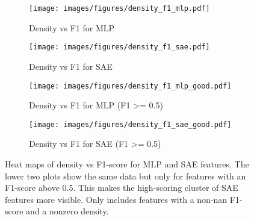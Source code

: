 \begin{figure}[h]
    \centering
    
    \begin{subfigure}[b]{0.45\textwidth}
        \centering
        \texttt{[image: images/figures/density\_f1\_mlp.pdf]}
        \caption{Density vs F1 for MLP}
        \label{fig:density_f1_mlp}
    \end{subfigure}
    \begin{subfigure}[b]{0.45\textwidth}
        \centering
        \texttt{[image: images/figures/density\_f1\_sae.pdf]}
        \caption{Density vs F1 for SAE}
        \label{fig:density_f1_sae}
    \end{subfigure}
    
    
    \begin{subfigure}[b]{0.45\textwidth}
        \centering
        \texttt{[image: images/figures/density\_f1\_mlp\_good.pdf]}
        \caption{Density vs F1 for MLP (F1 >= 0.5)}
        \label{fig:density_f1_mlp_good}
    \end{subfigure}
    \begin{subfigure}[b]{0.45\textwidth}
        \centering
        \texttt{[image: images/figures/density\_f1\_sae\_good.pdf]}
        \caption{Density vs F1 for SAE (F1 >= 0.5)}
        \label{fig:density_f1_sae_good}
    \end{subfigure}
    
    \caption{Heat maps of density vs F1-score for MLP and SAE features. The lower two plots show the same data but only for features with an F1-score above 0.5. This makes the high-scoring cluster of SAE features more visible. Only includes features with a non-nan F1-score and a nonzero density.}
    \label{fig:density_f1}
\end{figure}